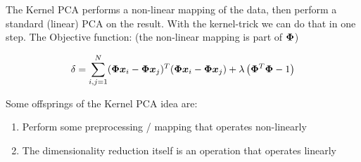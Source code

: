 The Kernel PCA performs a non-linear mapping of the data, then perform a standard (linear) PCA on the result. With the kernel-trick we can do that in one step. The Objective function: (the non-linear mapping is part of $\bm{\Phi}$)


\begin{equation*}
    \delta = \sum_{i,j=1}^{N} (\bm{\Phi}\bm{x}_i - \bm{\Phi}\bm{x}_j)^T (\bm{\Phi}\bm{x}_i - \bm{\Phi}\bm{x}_j) + \lambda\left(\bm{\Phi}^T\bm{\Phi}-1\right)
\end{equation*}

Some offsprings of the Kernel PCA idea are:
\begin{enumerate}
    \item Perform some preprocessing / mapping that operates non-linearly
    \item The dimensionality reduction itself is an operation that operates linearly
\end{enumerate}
